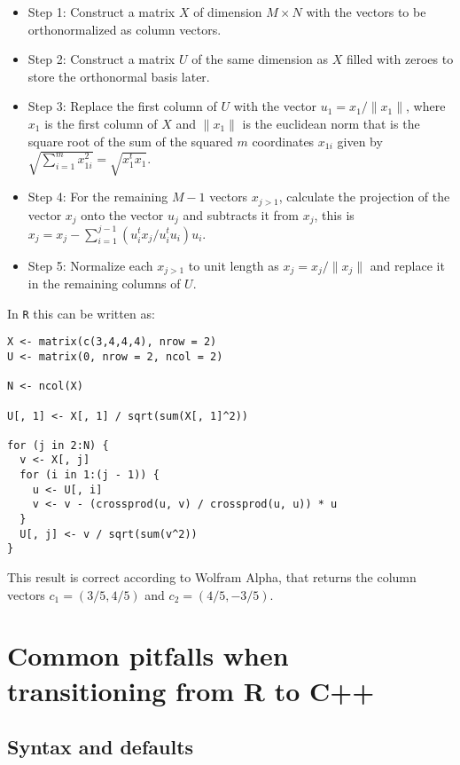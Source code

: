 \begin{itemize}
\tightlist
\item
  Step 1: Construct a matrix \(X\) of dimension \(M \times N\) with the vectors to
  be orthonormalized as column vectors.
\item
  Step 2: Construct a matrix \(U\) of the same dimension as \(X\) filled with zeroes
  to store the orthonormal basis later.
\item
  Step 3: Replace the first column of \(U\) with the vector
  \(u_1 = x_1 / \| x_1 \|\), where \(x_1\) is the first column of \(X\) and
  \(\| x_1 \|\) is the euclidean norm that is the square root of the sum of the
  squared \(m\) coordinates \(x_{1i}\) given by
  \(\sqrt{\sum_{i=1}^m x_{1i}^2} = \sqrt{x_1^t x_1}\).
\item
  Step 4: For the remaining \(M-1\) vectors \(x_{j>1}\), calculate the projection of
  the vector \(x_j\) onto the vector \(u_j\) and subtracts it from \(x_j\), this is
  \(x_j = x_j - \sum_{i=1}^{j-1} (u_i^t x_j / u_i^t u_i) u_i\).
\item
  Step 5: Normalize each \(x_{j>1}\) to unit length as \(x_j = x_j / \|x_j\|\) and
  replace it in the remaining columns of \(U\).
\end{itemize}

In \texttt{R} this can be written as:

\begin{verbatim}
X <- matrix(c(3,4,4,4), nrow = 2)
U <- matrix(0, nrow = 2, ncol = 2)

N <- ncol(X)

U[, 1] <- X[, 1] / sqrt(sum(X[, 1]^2))

for (j in 2:N) {
  v <- X[, j]
  for (i in 1:(j - 1)) {
    u <- U[, i]
    v <- v - (crossprod(u, v) / crossprod(u, u)) * u
  }
  U[, j] <- v / sqrt(sum(v^2))
}
\end{verbatim}

This result is correct according to Wolfram Alpha, that returns the column
vectors \(c_1 = (3/5,4/5)\) and \(c_2 = (4/5,-3/5)\).

\hypertarget{common-pitfalls-when-transitioning-from-r-to-c}{%
\section{Common pitfalls when transitioning from R to C++}\label{common-pitfalls-when-transitioning-from-r-to-c}}

\hypertarget{syntax-and-defaults}{%
\subsection{Syntax and defaults}\label{syntax-and-defaults}}

